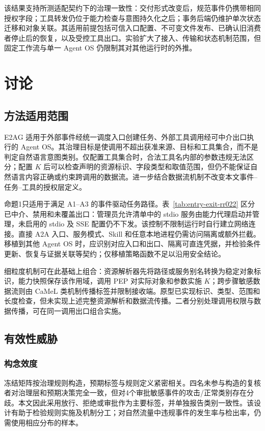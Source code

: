 该结果支持所测适配契约下的治理一致性：交付形式改变后，规范事件仍携带相同授权字段；工具转发仍位于能力检查与意图持久化之后；事务后端仍维护单次状态迁移和对象关联。其适用前提包括可信入口配置、不可变文件发布、已确认旧消费者停止后的恢复，以及受控工具出口。实验扩大了接入、传输和状态机制范围，但固定工作流与单一 Agent OS 仍限制其对其他运行时的外推。

\section{讨论}\label{sec:discussion-v11}

\subsection{方法适用范围}

E2AG 适用于外部事件经统一调度入口创建任务、外部工具调用经可中介出口执行的 Agent OS。其治理目标是使调用不超出获准来源、目标和工具集合，而不是判定自然语言意图类别。仅配置工具集合时，合法工具名内部的参数违规无法区分；配置 $K$ 后可以检查声明的资源标识、字段类型和取值范围，但仍不能保证自然语言内容正确或约束跨调用的数据流。进一步结合数据流机制不改变本文事件--任务--工具的授权层定义。

命题1只适用于满足 A1--A3 的事件驱动任务路径。表~\ref{tab:entry-exit-rr022} 区分已中介、禁用和未覆盖出口：管理员允许清单中的 stdio 服务由能力代理启动并管理，未启用的 stdio 及 SSE 配置仍不下发。该控制不限制运行时自行建立网络连接。直接 A2A 入口、服务模式、Skill 和任意本地进程仍需访问隔离或额外拦截。移植到其他 Agent OS 时，应识别对应入口和出口、隔离可直连凭据，并检验条件更新、恢复与证据关联等契约；仅移植策略函数不足以沿用安全结论。

细粒度机制可在此基础上组合：资源解析器先将路径或服务别名转换为稳定对象标识，能力快照保存该作用域，调用 PEP 对实际对象和参数实施 $K$；跨步骤敏感数据流则由 CaMeL 类机制传播标签并限制接收端。原型已实现标识、类型、范围和长度检查，但未实现上述完整资源解析和数据流传播。二者分别处理调用权限与数据传播，可在同一调用出口组合实施。

\subsection{有效性威胁}

\subsubsection{构念效度}

冻结矩阵按治理规则构造，预期标签与规则定义紧密相关。四名未参与构造的复核者对治理层和预期决策完全一致，但对4个审批敏感事件的攻击/正常类别存在分歧。本文因此采用放行、拒绝或审批作为主要标签，并单独报告类别一致性。该设计有助于检验规则实施及机制分工；对自然流量中违规事件的发生率与检出率，仍需使用相应分布的样本。

